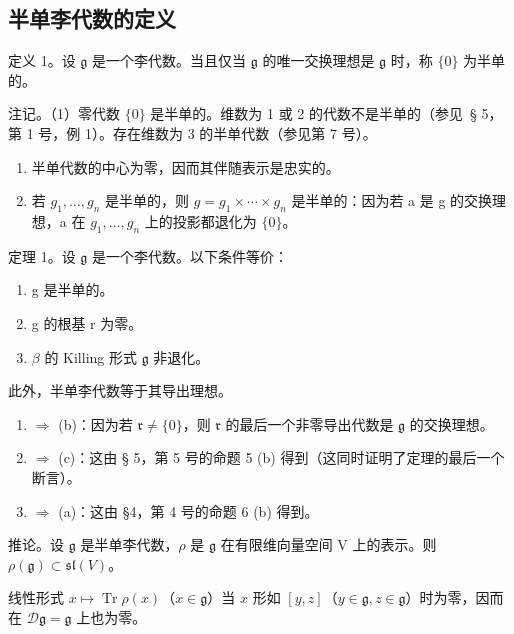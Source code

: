 \subsection{半单李代数的定义}

定义 1。设 \(\mathfrak{g}\) 是一个李代数。当且仅当 \(\mathfrak{g}\) 的唯一交换理想是 \(\mathfrak{g}\) 时，称 \(\{0\}\) 为半单的。

注记。（1）零代数 \(\{0\}\) 是半单的。维数为 1 或 2 的代数不是半单的（参见~§ 5，第 1 号，例 1）。存在维数为 3 的半单代数（参见第 7 号）。

\begin{enumerate}
\def\labelenumi{(\arabic{enumi})}
\setcounter{enumi}{1}
\item
  半单代数的中心为零，因而其伴随表示是忠实的。
\item
  若 \(g_{1}, \ldots, g_{n}\) 是半单的，则 \(g = g_{1} \times \cdots \times g_{n}\) 是半单的：因为若 a 是 g 的交换理想，a 在 \(g_{1}, \ldots, g_{n}\) 上的投影都退化为 \(\{0\}\)。
\end{enumerate}

定理 1。设 \(\mathfrak{g}\) 是一个李代数。以下条件等价：

\begin{enumerate}
\def\labelenumi{(\alph{enumi})}
\item
  g 是半单的。
\item
  g 的根基 r 为零。
\item
  \(\beta\) 的 Killing 形式 \(\mathfrak{g}\) 非退化。
\end{enumerate}

此外，半单李代数等于其导出理想。

\begin{enumerate}
\def\labelenumi{(\alph{enumi})}
\item
  \(\Rightarrow\) (b)：因为若 \(\mathfrak{r} \neq \{0\}\)，则 \(\mathfrak{r}\) 的最后一个非零导出代数是 \(\mathfrak{g}\) 的交换理想。
\item
  \(\Rightarrow\) (c)：这由 § 5，第 5 号的命题 5 (b) 得到（这同时证明了定理的最后一个断言）。
\item
  \(\Rightarrow\) (a)：这由 §4，第 4 号的命题 6 (b) 得到。
\end{enumerate}

推论。设 \(\mathfrak{g}\) 是半单李代数，\(\rho\) 是 \(\mathfrak{g}\) 在有限维向量空间 V 上的表示。则 \(\rho(\mathfrak{g}) \subset \mathfrak{sl}(V)\)。

线性形式 \(x \mapsto \operatorname{Tr} \rho(x)\)（\(x \in \mathfrak{g}\)）当 \(x\) 形如 \([y, z]\)（\(y \in \mathfrak{g}, z \in \mathfrak{g}\)）时为零，因而在 \(\mathcal{D}\mathfrak{g} = \mathfrak{g}\) 上也为零。

